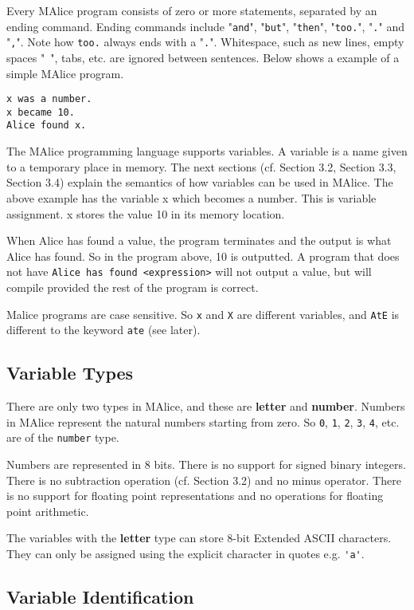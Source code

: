 \documentclass[a4wide, 10pt]{article}
\begin{document}
Every MAlice program consists of zero or more statements, separated by an ending command. Ending commands include "\verb+and+", "\verb+but+", "\verb+then+", "\verb+too.+", "\verb+.+" and "\verb+,+". Note how \verb+too.+ always ends with a "\verb+.+". Whitespace, such as new lines, empty spaces "\verb+ +", tabs, etc. are ignored between sentences. Below shows a example of a simple MAlice program.

\begin{lstlisting}
x was a number.
x became 10.
Alice found x.
\end{lstlisting}

The MAlice programming language supports variables. 
A variable is a name given to a temporary place in memory. 
The next sections (cf. Section 3.2, Section 3.3, Section 3.4) explain the
semantics of how variables can be used in MAlice. The above example has the variable x which
becomes a number. This is variable assignment. x stores the value 10 in its memory location.

When Alice has found a value, the program terminates and the output is what Alice has found.
So in the program above, 10 is outputted. A program that does not have \verb+Alice has found <expression>+ 
will not output a value, but will compile provided the rest of the program is correct.

Malice programs are case sensitive. So \verb+x+ and \verb+X+ are different variables, and \verb+AtE+ is different to the keyword \verb+ate+ (see later).

\subsection{Variable Types}
There are only two types in MAlice, and these are \textbf{letter} and \textbf{number}. Numbers in MAlice represent the natural numbers
starting from zero. So \verb+0+, \verb+1+, \verb+2+, \verb+3+, \verb+4+, etc. are of the \verb+number+ type. 

Numbers are represented in 8 bits. There is no support for signed binary integers. There is no subtraction operation (cf. Section 3.2) and no minus operator. There is no support for floating point representations and no operations for floating point arithmetic. 

The variables with the \textbf{letter} type can store 8-bit Extended ASCII characters. They can only
be assigned using the explicit character in quotes e.g. \verb+'a'+. 


\subsection{Variable Identification}
\end{document}
